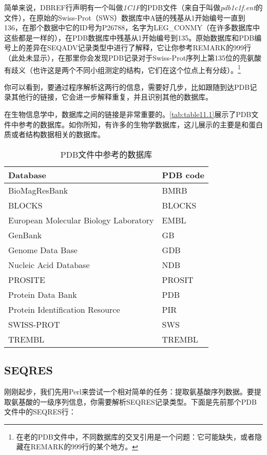 简单来说，DBREF行声明有一个叫做\textit{1C1F}的PDB文件（来自于叫做\textit{pdb1c1f.ent}的文件），在原始的Swiss-Prot（SWS）数据库中A链的残基从1开始编号一直到136，在那个数据中它的ID号为P26788，名字为LEG\_CONMY（在许多数据库中这些都是一样的），在PDB数据库中残基从1开始编号到135。原始数据库和PDB编号上的差异在SEQADV记录类型中进行了解释，它让你参考REMARK的999行（此处未显示），在那里你会发现PDB记录对于Swiss-Prot序列上第135位的亮氨酸有歧义（也许这是两个不同小组测定的结构，它们在这个位点上有分歧）。\footnote{在老的PDB文件中，不同数据库的交叉引用是一个问题：它可能缺失，或者隐藏在REMARK的999行的某个地方。} 

你可以看到，要通过程序解析这两行的信息，需要好几步，比如跟随到达PDB记录其他行的链接，它会进一步解释重复，并且识别其他的数据库。

在生物信息学中，数据库之间的链接是非常重要的。\autoref{tab:table11.1}展示了PDB文件中参考的数据库。如你所知，有许多的生物学数据库，这儿展示的主要是和蛋白质或者结构数据相关的数据库。

\begin{table}[!htbp]
  \begin{center}
  \caption{PDB文件中参考的数据库}
  \label{tab:table11.1}
  \begin{tabu} to 1.6\linewidth {X[3,l,m]X[1,l,m]}
  \toprule
  Database & PDB code\\
  \midrule
  BioMagResBank & BMRB \\
  BLOCKS & BLOCKS\\
  European Molecular Biology Laboratory & EMBL\\
  GenBank & GB\\
  Genome Data Base & GDB\\
  Nucleic Acid Database & NDB\\
  PROSITE & PROSIT\\
  Protein Data Bank & PDB\\
  Protein Identification Resource & PIR\\
  SWISS-PROT & SWS\\
  TREMBL & TREMBL\\
  \bottomrule
  \end{tabu}
  \end{center}
\end{table}

\subsection{SEQRES}
刚刚起步，我们先用Perl来尝试一个相对简单的任务：提取氨基酸序列数据。要提取氨基酸的一级序列信息，你需要解析SEQRES记录类型。下面是先前那个PDB文件中的SEQRES行：

